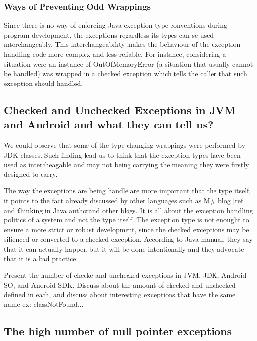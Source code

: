 \documentclass[conference]{IEEEtran}
\begin{document}
\subsubsection{Ways of Preventing Odd Wrappings}
Since there is no way of enforcing Java exception type conventions during program development,
the exceptions regardless its types can se used interchangeably. This interchangeability makes the
behaviour of the exception handling code more complex and less reliable. For
instance, considering a situation were an instance of OutOfMemoryError (a situation that usually cannot
 be handled) was wrapped in a checked exception which tells the caller that such exception should
handled.


\subsection{Checked and Unchecked Exceptions in JVM and Android and what they can tell us?}

We could observe that some of the type-changing-wrappings were performed by JDK classes.
Such finding lead us to think that the exception types have been used as intercheagable and may not being carrying 
the meaning they were firstly designed to carry.

The way the exceptions are being handle are more important that the type itself, it points to the fact already discussed 
by other languages such as M\# blog [ref] and \"thinking in Java author\" and other blogs. It is all about the exception handling
politics of a system and not the type itself. The exception type is not enought to ensure a more strict or robust development,
since the checked exceptions may be silienced or converted to a checked exception. According to Java manual,
they say that it can actually happen but it will be done intentionally and they advocate that it is a bad practice.

Present the number of checke and unchecked exceptions in JVM, JDK, Android SO, and Android SDK.
Discuss about the amount of checked and unchecked defined in each, and discuss about interesting exceptions that
have the same name ex: classNotFound...




\subsection{The high number of null pointer exceptions}  
\end{document}
